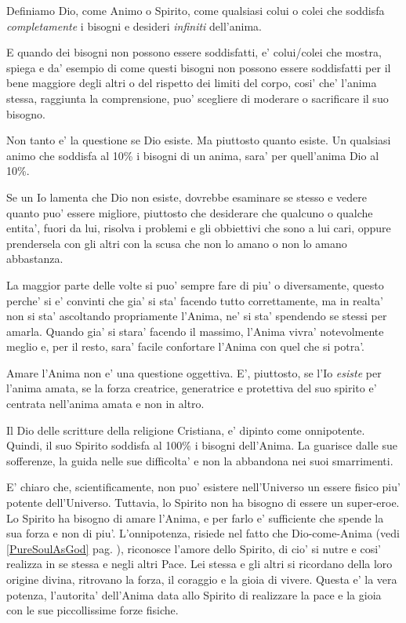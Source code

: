    Definiamo Dio, come Animo o Spirito, come qualsiasi colui o colei che soddisfa \emph{completamente} i bisogni e desideri \emph{infiniti} dell'anima. 

   E quando dei bisogni non possono essere soddisfatti, e' colui/colei che mostra, spiega e da' esempio di come questi bisogni non possono essere soddisfatti per il bene maggiore degli altri o del rispetto dei limiti del corpo, cosi' che' l'anima stessa, raggiunta la comprensione, puo' scegliere di moderare o sacrificare il suo bisogno.

   Non tanto e' la questione se Dio esiste. Ma piuttosto quanto esiste. Un qualsiasi animo che soddisfa al 10\% i bisogni di un anima, sara' per quell'anima Dio al 10\%.

   Se un Io lamenta che Dio non esiste, dovrebbe esaminare se stesso e vedere quanto puo' essere migliore, piuttosto che desiderare che qualcuno o qualche entita', fuori da lui, risolva i problemi e gli obbiettivi che sono a lui cari, oppure prendersela con gli altri con la scusa che non lo amano o non lo amano abbastanza.

    La maggior parte delle volte si puo' sempre fare di piu' o diversamente, questo perche' si e' convinti che gia' si sta' facendo tutto correttamente, ma in realta' non si sta' ascoltando propriamente l'Anima, ne' si sta' spendendo se stessi per amarla. Quando gia' si stara' facendo il massimo, l'Anima vivra' notevolmente meglio e, per il resto, sara' facile confortare l'Anima con quel che si potra'.

    Amare l'Anima non e' una questione oggettiva. E', piuttosto, se l'Io \emph{esiste} per l'anima amata, se la forza creatrice, generatrice e protettiva del suo spirito e' centrata nell'anima amata e non in altro. 

    Il Dio delle scritture della religione Cristiana, e' dipinto come onnipotente. Quindi, il suo Spirito soddisfa al 100\% i bisogni dell'Anima. La guarisce dalle sue sofferenze, la guida nelle sue difficolta' e non la abbandona nei suoi smarrimenti.

    E' chiaro che, scientificamente, non puo' esistere nell'Universo un essere fisico piu' potente dell'Universo. Tuttavia, lo Spirito non ha bisogno di essere un super-eroe. Lo Spirito ha bisogno di amare l'Anima, e per farlo e' sufficiente che spende la sua forza e non di piu'. L'onnipotenza, risiede nel fatto che Dio-come-Anima (vedi \ref{PureSoulAsGod} pag. \pageref{PureSoulAsGod}), riconosce l'amore dello Spirito, di cio' si nutre e cosi' realizza in se stessa e negli altri Pace. Lei stessa e gli altri si ricordano della loro origine divina, ritrovano la forza, il coraggio e la gioia di vivere.
    Questa e' la vera potenza, l'autorita' dell'Anima data allo Spirito di realizzare la pace e la gioia con le sue piccollissime forze fisiche.

